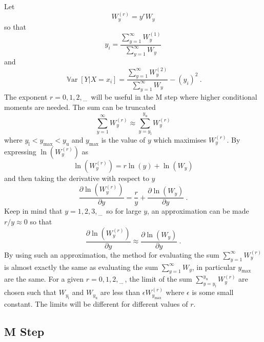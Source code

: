 \documentclass[12pt, a4paper]{memoir}
\DeclareMathOperator{\variance}{\mathbb{V}ar}
\newcommand{\dotdotdot}{_{\phantom{.}\cdots}}
\begin{document}
Let
\begin{equation}
W_y^{(r)} = y^r W_y
\end{equation}
so that
\begin{equation}
y_i = \frac{\sum_{y=1}^\infty W^{(1)}_y}{\sum_{y=1}^\infty W_y}
\end{equation}
and
\begin{equation}
\variance[Y|X=x_i] = \frac{\sum_{y=1}^\infty W^{(2)}_y}{\sum_{y=1}^\infty W_y} - \left(y_i\right)^2 \ .
\end{equation}
The exponent $r=0,1,2,\dotdotdot$ will be useful in the M step where higher conditional moments are needed.
The sum can be truncated
\begin{equation}
\sum_{y=1}^\infty W^{(r)}_y \approx \sum_{y=y_\text{l}}^{y_\text{u}} W^{(r)}_y
\end{equation}
where $y_\text{l}<y_\text{max}<y_\text{u}$ and $y_\text{max}$ is the value of $y$ which maximises $W_y^{(r)}$. By expressing $\ln(W^{(r)}_y)$ as
\begin{equation}
\ln\left(W_y^{(r)}\right)=r\ln(y)+\ln(W_y)
\end{equation}
and then taking the derivative with respect to $y$
\begin{equation}
\frac{\partial \ln(W_y^{(r)})}{\partial y} = \frac{r}{y } + \frac{\partial \ln(W_y)}{\partial y} \ .
\end{equation}
Keep in mind that $y=1,2,3,\dotdotdot$ so for large $y$, an approximation can be made $r/y\approx 0$ so that
\begin{equation}
\frac{\partial \ln(W_y^{(r)})}{\partial y} \approx \frac{\partial \ln(W_y)}{\partial y} \ .
\end{equation}
By using such an approximation, the method for evaluating the sum $\sum_{y=1}^\infty W^{(r)}_y$ is almost exactly the same as evaluating the sum $\sum_{y=1}^\infty W_y$, in particular $y_\text{max}$ are the same. For a given $r=0,1,2,\dotdotdot$, the limit of the sum $\sum_{y=y_\text{l}}^{y_\text{u}} W^{(r)}_y$ are chosen such that $W_{y_\text{l}}$ and $W_{y_\text{u}}$ are less than $\epsilon W_{y_\text{max}}^{(r)}$ where $\epsilon$ is some small constant. The limits will be different for different values of $r$.

\subsection{M Step}
\end{document}
